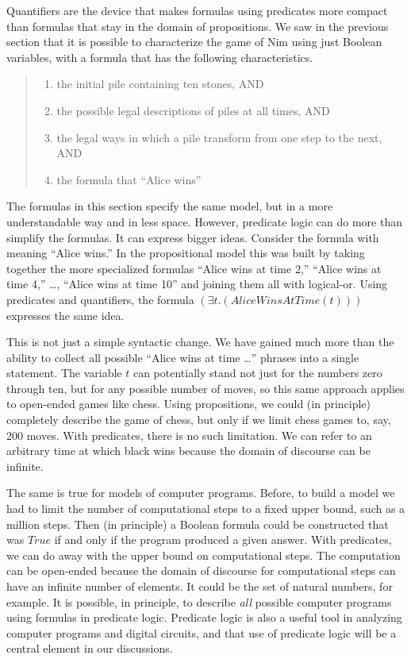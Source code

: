 {{Quantifiers are the device that makes formulas using predicates more compact than
formulas that stay in the domain of propositions.
We saw in the previous section that it
is possible to characterize the game of Nim using just Boolean variables,
with a formula that has the following characteristics.

\begin{quote}
\begin{enumerate}
\item the initial pile containing ten stones, AND
\item the possible legal descriptions of piles at all times, AND
\item the legal ways in which a pile transform from one step to the next, AND
\item the formula that ``Alice wins''
\end{enumerate}
\end{quote}

The formulas in this section specify the same model, but in a more understandable
way and in less space.
However, predicate logic can do more than simplify the formulas.
It can express bigger ideas.
Consider the formula with meaning ``Alice wins.''
In the propositional model this was built by taking together the more specialized formulas
``Alice wins at time 2,'' ``Alice wins at time 4,'' \dots, ``Alice wins at time 10''
and joining them all with logical-or.
Using predicates and quantifiers, the formula $(\exists t.(AliceWinsAtTime(t)))$ expresses
the same idea.

This is not just a simple syntactic change.
We have gained much more than the ability to
collect all possible ``Alice wins at time \dots'' phrases into a single statement.
The variable $t$ can potentially stand not just for the numbers zero through ten,
but for any possible number of moves, so
this same approach applies to open-ended games like chess.
Using propositions, we could (in principle)
completely describe the game of chess, but only if we limit chess games to, say, 200 moves.
With predicates, there is no such limitation.
We can refer to an arbitrary time at which black wins because the domain of discourse
can be infinite.

The same is true for models of computer programs.
Before, to build a model we had to limit the number of computational steps to a fixed upper bound,
such as a million steps.
Then (in principle)
a Boolean formula could be constructed that was $True$
if and only if the program produced a given answer.
With predicates, we can do away with the upper bound on computational steps.
The computation can be open-ended because the domain of discourse for computational steps
can have an infinite number of elements. It could be the set of natural numbers, for example.
It is possible, in principle, to describe \emph{all} possible computer programs
using formulas in predicate logic.
Predicate logic is also a useful tool in analyzing computer programs and digital circuits,
and that use of predicate logic will be a central element in our discussions.

}}
